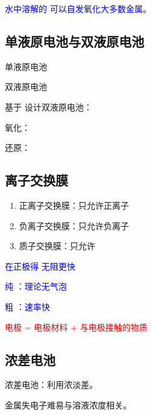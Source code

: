         \textcolor{blue}{水中溶解的  可以自发氧化大多数金属。}

    \subsection{单液原电池与双液原电池}\label{subsec:单液双液原电池}

        \noindent
        \begin{minipage}[t]{0.48\textwidth}
            \centering
            单液原电池\\[2pt]
            \resizebox{0.98\linewidth}{!}{}
        \end{minipage}
        \hfill
        \begin{minipage}[t]{0.48\textwidth}
            \centering
            双液原电池\\[2pt]
            \resizebox{0.98\linewidth}{!}{}
        \end{minipage}

        基于  设计双液原电池：

        氧化：

        还原：

    \subsection{离子交换膜}\label{subsec:离子交换膜}

        \begin{enumerate}
            \item 正离子交换膜：只允许正离子
            \item 负离子交换膜：只允许负离子
            \item 质子交换膜：只允许 
        \end{enumerate}

        \textcolor{blue}{ 在正极得  无阻更快}

        \textcolor{blue}{纯 ：理论无气泡}

        \textcolor{blue}{粗 ：速率快}

        \textcolor{red}{电极 = 电极材料 + 与电极接触的物质}

    \subsection{浓差电池}\label{subsec:浓差电池}

        浓差电池：利用浓淡差。

        金属失电子难易与溶液浓度相关。


